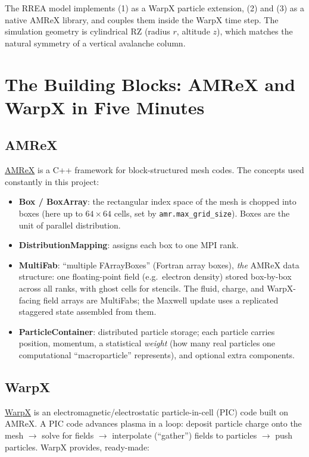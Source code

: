 \documentclass[11pt]{article}
\DeclareRobustCommand{\code}[1]{\ifmmode\text{\ttfamily#1}\else\nolinkurl{#1}\fi}
\begin{document}
The RREA model implements (1) as a WarpX particle extension, (2) and (3) as
a native AMReX library, and couples them inside the WarpX time step. The
simulation geometry is cylindrical RZ (radius $r$, altitude $z$), which
matches the natural symmetry of a vertical avalanche column.

\section{The Building Blocks: AMReX and WarpX in Five Minutes}\label{sec:blocks}

\subsection{AMReX}

\href{https://amrex-codes.github.io}{AMReX} is a C++ framework for
block-structured mesh codes. The concepts used constantly in this project:

\begin{itemize}
  \item \textbf{Box / BoxArray}: the rectangular index space of the mesh is
  chopped into boxes (here up to $64\times64$ cells, set by
  \code{amr.max\_grid\_size}). Boxes are the unit of parallel distribution.
  \item \textbf{DistributionMapping}: assigns each box to one MPI rank.
  \item \textbf{MultiFab}: ``multiple FArrayBoxes'' (Fortran array
  boxes), \emph{the}
  AMReX data structure: one floating-point field (e.g.\ electron density)
  stored box-by-box across all ranks, with ghost cells for stencils. The fluid,
  charge, and WarpX-facing field arrays are MultiFabs; the Maxwell update uses
  a replicated staggered state assembled from them.
  \item \textbf{ParticleContainer}: distributed particle storage; each
  particle carries position, momentum, a statistical \emph{weight}
  (how many real particles one computational ``macroparticle'' represents),
  and optional extra components.
\end{itemize}

\subsection{WarpX}

\href{https://ecp-warpx.github.io}{WarpX} is an electromagnetic/electrostatic
particle-in-cell (PIC) code built on AMReX. A PIC code advances plasma in a
loop: deposit particle charge onto the mesh $\to$ solve for fields $\to$
interpolate (``gather'') fields to particles $\to$ push particles. WarpX
provides, ready-made:
\end{document}
